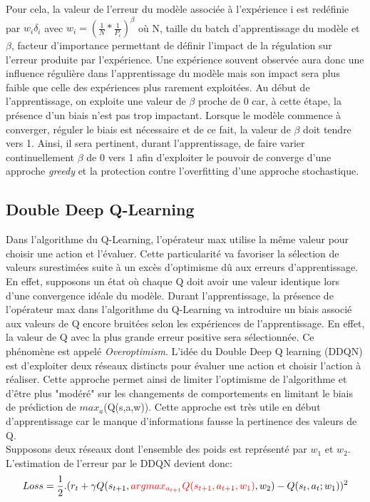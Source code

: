 \noindent Pour cela, la valeur de l'erreur du modèle associée à l'expérience i est redéfinie par $w_i\delta_i$ avec $w_i=(\frac{1}{N}*\frac{1}{P_i})^\beta$ où N, taille du batch d'apprentissage du modèle et $\beta$, facteur d'importance permettant de définir l'impact de la régulation sur l'erreur produite par l'expérience. Une expérience souvent observée aura donc une influence régulière dans l'apprentissage du modèle mais son impact sera plus faible que celle des expériences plus rarement exploitées. Au début de l'apprentissage, on exploite une valeur de $\beta$ proche de 0 car, à cette étape, la présence d'un biais n'est pas trop impactant. Lorsque le modèle commence à converger, réguler le biais est nécessaire et de ce fait, la valeur de $\beta$ doit tendre vers 1. Ainsi, il sera pertinent, durant l'apprentissage, de faire varier continuellement $\beta$ de 0 vers 1 afin d'exploiter le pouvoir de converge d'une approche \textit{greedy} et la protection contre l'overfitting d'une approche stochastique.

\subsection{Double Deep Q-Learning}
\noindent  Dans l'algorithme du Q-Learning, l'opérateur max utilise la même valeur pour choisir une action et l'évaluer. Cette particularité va favoriser la sélection de valeurs surestimées suite à un excès d'optimisme dû aux erreurs d'apprentissage. En effet, supposons un état où chaque Q doit avoir une valeur identique lors d'une convergence idéale du modèle. Durant l'apprentissage, la présence de l'opérateur max dans l'algorithme du Q-Learning va introduire un biais associé aux valeurs de Q encore bruitées selon les expériences de l'apprentissage. En effet, la valeur de Q avec la plus grande erreur positive sera sélectionnée. Ce phénomène est appelé \textit{Overoptimism}. L'idée du Double Deep Q learning (DDQN)\cite{ddqn} est d'exploiter deux réseaux distincts pour évaluer une action et choisir l'action à réaliser. Cette approche permet ainsi de limiter l'optimisme de l'algorithme et d'être plus "modéré" sur les changements de comportements en limitant le biais de prédiction de $max_a$(Q(s,a,w)). Cette approche est très utile en début d'apprentissage car le manque d'informations fausse la pertinence des valeurs de Q. \\

\noindent Supposons deux réseaux dont l'ensemble des poids est représenté par $w_1$ et $w_2$. L'estimation de l'erreur par le DDQN devient donc:\\
$$Loss=\frac{1}{2}.(r_t+\gamma Q(s_{t+1},\textcolor{red}{argmax_{a_{t+1}}Q(s_{t+1},a_{t+1},w_1)},w_2)-Q(s_t,a_t;w_1))^2$$

